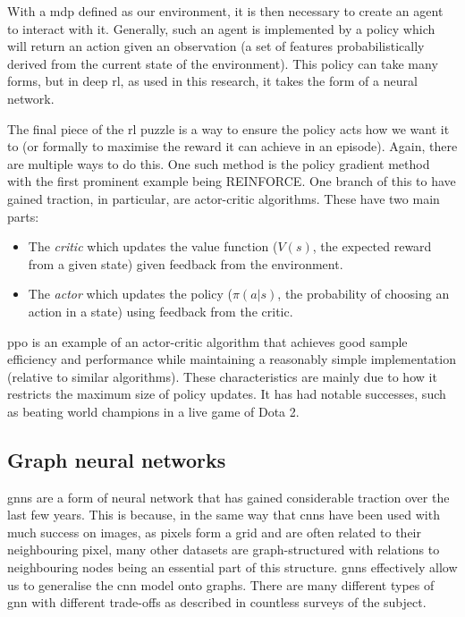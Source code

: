 With a \ac{mdp} defined as our environment, it is then necessary to create an agent to interact with it. Generally, such an agent is implemented by a policy which will return an action given an observation (a set of features probabilistically derived from the current state of the environment). This policy can take many forms, but in deep \ac{rl}, as used in this research, it takes the form of a neural network.

The final piece of the \ac{rl} puzzle is a way to ensure the policy acts how we want it to (or formally to maximise the reward it can achieve in an episode). Again, there are multiple ways to do this. One such method is the policy gradient method with the first prominent example being REINFORCE\cite{williams1992simple}. One branch of this to have gained traction, in particular, are actor-critic algorithms. These have two main parts:

\begin{itemize}
    \item The \emph{critic} which updates the value function ($V(s)$, the expected reward from a given state) given feedback from the environment.
    \item The \emph{actor} which updates the policy ($\pi(a|s)$, the probability of choosing an action in a state) using feedback from the critic.
\end{itemize}

\Acf{ppo}\cite{schulman2017proximal} is an example of an actor-critic algorithm that achieves good sample efficiency and performance while maintaining a reasonably simple implementation (relative to similar algorithms). These characteristics are mainly due to how it restricts the maximum size of policy updates. It has had notable successes, such as beating world champions in a live game of Dota 2\cite{openai2019dota}.

\subsection{Graph neural networks}
\label{section:graph_neural_networks}

\Acfp{gnn}\cite{gori2005new,scarselli2008graph} are a form of neural network that has gained considerable 
traction over the last few years. This is because, in the same way that \acp{cnn} have been used with much success on images, as pixels form a grid and are often related to their neighbouring pixel, many other datasets are graph-structured with relations to neighbouring nodes being an essential part of this structure. \Acp{gnn} effectively allow us to generalise the \ac{cnn} model onto graphs. There are many different types of \ac{gnn} with different trade-offs as described in countless surveys of the subject\cite{zhou2018graph,Wu_2020}.

